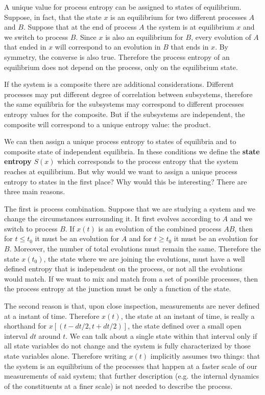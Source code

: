 \documentclass[letterpaper,twocolumn]{article}
\begin{document}
A unique value for process entropy can be assigned to states of equilibrium. Suppose, in fact, that the state $x$ is an equilibrium for two different processes $A$ and $B$. Suppose that at the end of process $A$ the system is at equilibrium $x$ and we switch to process $B$. Since $x$ is also an equilibrium for $B$, every evolution of $A$ that ended in $x$ will correspond to an evolution in $B$ that ends in $x$. By symmetry, the converse is also true. Therefore the process entropy of an equilibrium does not depend on the process, only on the equilibrium state.

If the system is a composite there are additional considerations. Different processes may put different degree of correlation between subsystems, therefore the same equilibria for the subsystems may correspond to different processes entropy values for the composite. But if the subsystems are independent, the composite will correspond to a unique entropy value: the product.

We can then assign a unique process entropy to states of equilibria and to composite state of independent equilibria. In these conditions we define the \textbf{state entropy} $S(x)$ which corresponds to the process entropy that the system reaches at equilibrium. But why would we want to assign a unique process entropy to states in the first place? Why would this be interesting? There are three main reasons.

The first is process combination. Suppose that we are studying a system and we change the circumstances surrounding it. It first evolves according to $A$ and we switch to process $B$. If $x(t)$ is an evolution of the combined process $AB$, then for $t\leq t_0$ it must be an evolution for $A$ and for $t\geq t_0$ it must be an evolution for $B$. Moreover, the number of total evolutions must remain the same. Therefore the state $x(t_0)$, the state where we are joining the evolutions, must have a well defined entropy that is independent on the process, or not all the evolutions would match. If we want to mix and match from a set of possible processes, then the process entropy at the junction must be only a function of the state.

The second reason is that, upon close inspection, measurements are never defined at a instant of time. Therefore $x(t)$, the state at an instant of time, is really a shorthand for $x[(t - dt/2, t + dt/2)]$, the state defined over a small open interval $dt$ around $t$. We can talk about a single state within that interval only if all state variables do not change and the system is fully characterized by those state variables alone. Therefore writing $x(t)$ implicitly assumes two things: that the system is an equilibrium of the processes that happen at a faster scale of our measurements of said system; that further description (e.g. the internal dynamics of the constituents at a finer scale) is not needed to describe the process.
\end{document}
